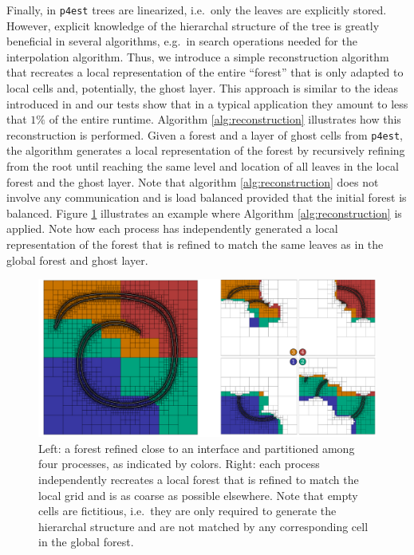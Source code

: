 Finally, in \texttt{p4est} trees are linearized, i.e.\ only the leaves are explicitly stored. However, explicit knowledge of the hierarchal structure of the tree is greatly beneficial in several algorithms, e.g.\ in search operations needed for the interpolation algorithm. Thus, we introduce a simple reconstruction algorithm that recreates a local representation of the entire ``forest'' that is only adapted to local cells and, potentially, the ghost layer. This approach is similar to the ideas introduced in \cite{Bangerth;Burstedde;Heister;etal:11:Algorithms-and-data-} and our tests show that in a typical application they amount to less that $1\%$ of the entire runtime. Algorithm \ref{alg:reconstruction} illustrates how this reconstruction is performed. Given a forest and a layer of ghost cells from \texttt{p4est}, the algorithm generates a local representation of the forest by recursively refining from the root until reaching the same level and location of all leaves in the local forest and the ghost layer. Note that algorithm \ref{alg:reconstruction} does not involve any communication and is load balanced provided that the initial forest is balanced. Figure \ref{fig:reconstruction} illustrates an example where Algorithm \ref{alg:reconstruction} is applied. Note how each process has independently generated a local representation of the forest that is refined to match the same leaves as in the global forest and ghost layer.
\begin{figure}[htbp]
\begin{center}
\includegraphics[width = \textwidth]{figures/reconstruct.pdf}
\end{center}
\caption{Left: a forest refined close to an interface and partitioned among four processes, as indicated by colors. Right: each process independently recreates a local forest that is refined to match the local grid and is as coarse as possible elsewhere. Note that empty cells are fictitious, i.e.\ they are only required to generate the hierarchal structure and are not matched by any corresponding cell in the global forest.}
\label{fig:reconstruction}
\end{figure}
